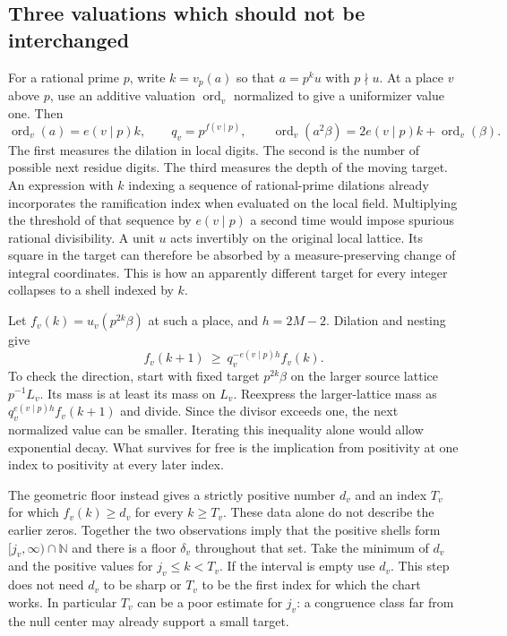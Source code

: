 \documentclass[12pt,letterpaper]{article}
\begin{document}
\subsection{Three valuations which should not be interchanged}
For a rational prime $p$, write $k=v_p(a)$ so that $a=p^k u$ with $p\nmid u$. At a place $v$ above $p$, use an additive valuation $\operatorname{ord}_v$ normalized to give a uniformizer value one. Then
\[
       \operatorname{ord}_v(a)=e(v\mid p)k,\qquad
       q_v=p^{f(v\mid p)},\qquad
       \operatorname{ord}_v(a^2\beta)=2e(v\mid p)k+\operatorname{ord}_v(\beta).
\]
The first measures the dilation in local digits. The second is the number of possible next residue digits. The third measures the depth of the moving target. An expression with $k$ indexing a sequence of rational-prime dilations already incorporates the ramification index when evaluated on the local field. Multiplying the threshold of that sequence by $e(v\mid p)$ a second time would impose spurious rational divisibility. A unit $u$ acts invertibly on the original local lattice. Its square in the target can therefore be absorbed by a measure-preserving change of integral coordinates. This is how an apparently different target for every integer collapses to a shell indexed by $k$.

Let $f_v(k)=u_v(p^{2k}\beta)$ at such a place, and $h=2M-2$. Dilation and nesting give
\[
            f_v(k+1)\ \ge\ q_v^{-e(v\mid p)h} f_v(k).
\]
To check the direction, start with fixed target $p^{2k}\beta$ on the larger source lattice $p^{-1}L_v$. Its mass is at least its mass on $L_v$. Reexpress the larger-lattice mass as $q_v^{e(v\mid p)h} f_v(k+1)$ and divide. Since the divisor exceeds one, the next normalized value can be smaller. Iterating this inequality alone would allow exponential decay. What survives for free is the implication from positivity at one index to positivity at every later index.

The geometric floor instead gives a strictly positive number $d_v$ and an index $T_v$ for which $f_v(k)\ge d_v$ for every $k\ge T_v$. These data alone do not describe the earlier zeros. Together the two observations imply that the positive shells form $[j_v,\infty)\cap\mathbb N$ and there is a floor $\delta_v$ throughout that set. Take the minimum of $d_v$ and the positive values for $j_v\le k<T_v$. If the interval is empty use $d_v$. This step does not need $d_v$ to be sharp or $T_v$ to be the first index for which the chart works. In particular $T_v$ can be a poor estimate for $j_v$: a congruence class far from the null center may already support a small target.
\end{document}
